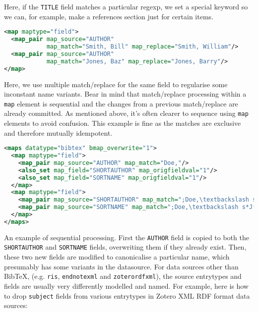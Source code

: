 \documentclass{ltxdockit}
\begin{document}
\noindent Here, if the \verb+TITLE+ field matches a particular
regexp, we set a special keyword so we can, for example, make a
references section just for certain items.

\begin{lstlisting}[language=xml,escapechar=:,mathescape=true]
<map maptype="field">
  <map_pair map_source="AUTHOR"
            map_match="Smith, Bill" map_replace="Smith, William"/>
  <map_pair map_source="AUTHOR"
            map_match="Jones, Baz" map_replace="Jones, Barry"/>
</map>
\end{lstlisting}

\noindent Here, we use multiple match/replace for the same field to
regularise some inconstant name variants. Bear in mind that
match/replace processing within a \verb+map+ element is sequential and
the changes from a previous match/replace are already committed. As
mentioned above, it's often clearer to sequence using \verb+map+
elements to avoid confusion. This example is fine as the matches are
exclusive and therefore mutually idempotent.

\begin{lstlisting}[language=xml,escapechar=;,mathescape=true]
<maps datatype="bibtex" bmap_overwrite="1">
  <map maptype="field">
    <map_pair map_source="AUTHOR" map_match="Doe,"/>
    <also_set map_field="SHORTAUTHOR" map_origfieldval="1"/>
    <also_set map_field="SORTNAME" map_origfieldval="1"/>
  </map>
  <map maptype="field">
    <map_pair map_source="SHORTAUTHOR" map_match=";Doe,\textbackslash s*J(?:\textbackslash .|ohn)(?:[ -]*)(?:P\textbackslash .|Paul)*;" map_replace="Doe, John Paul"/>
    <map_pair map_source="SORTNAME" map_match=";Doe,\textbackslash s*J(?:\textbackslash .|ohn)(?:[ -]*)(?:P\textbackslash .|Paul)*;" map_replace="Doe, John Paul"/>
  </map>
</maps>
\end{lstlisting}

\noindent An example of sequential processing. First the \verb+AUTHOR+
field is copied to both the \verb+SHORTAUTHOR+ and \verb+SORTNAME+
fields, overwriting them if they already exist. Then, these two new
fields are modified to canonicalise a particular name, which
presumably has some variants in the datasource.
\bigskip
{}
For data sources other than Bib\TeX, (e.g. \verb+ris+,
\verb+endnotexml+ and \verb+zoterordfxml+), the source entrytypes and
fields are usually very differently modelled and named. For example, here
is how to drop \verb+subject+ fields from various entrytypes in Zotero XML
RDF format data sources:
\end{document}
